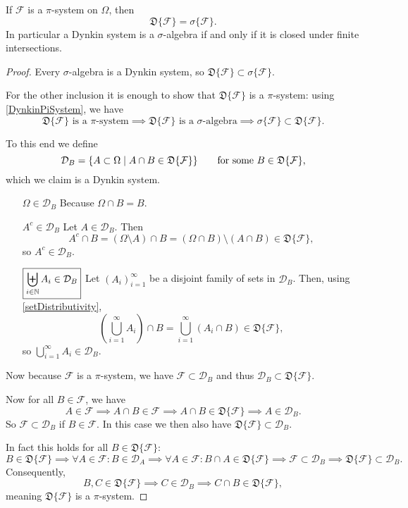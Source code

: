 \begin{proposition} \label{generatedDynkinSigma}
If $\mathcal{F}$ is a $\pi$-system on $\Omega$, then
\[ \mathfrak{D}\{\mathcal{F}\} = \sigma\{\mathcal{F}\}. \]
In particular a Dynkin system is a $\sigma$-algebra \textup{if and only if} it is closed under finite intersections.
\end{proposition}
\begin{proof}
Every $\sigma$-algebra is a Dynkin system, so $\mathfrak{D}\{\mathcal{F}\} \subset \sigma\{\mathcal{F}\}$.

For the other inclusion it is enough to show that $\mathfrak{D}\{\mathcal{F}\}$ is a $\pi$-system: using \ref{DynkinPiSystem}, we have
\[ \text{$\mathfrak{D}\{\mathcal{F}\}$ is a $\pi$-system} \implies \text{$\mathfrak{D}\{\mathcal{F}\}$ is a $\sigma$-algebra} \implies \sigma\{\mathcal{F}\}\subset\mathfrak{D}\{\mathcal{F}\}. \]

To this end we define
\[ \mathcal{D}_B = \setbuilder{A\subset\Omega}{A\cap B\in\mathfrak{D}\{\mathcal{F}\}} \qquad \text{for some $B\in\mathfrak{D}\{\mathcal{F}\}$,} \]
which we claim is a Dynkin system.
\begin{itemize}[leftmargin=2.5cm]
\item[$\boxed{\Omega\in\mathcal{D}_B}$] Because $\Omega\cap B = B$.
\item[$\boxed{A^c\in\mathcal{D}_B}$] Let $A\in\mathcal{D}_B$. Then
\[ A^c\cap B = (\Omega\setminus A)\cap B = (\Omega\cap B)\setminus(A\cap B) \in \mathfrak{D}\{\mathcal{F}\}, \]
so $A^c\in\mathcal{D}_B$.
\item[$\boxed{\biguplus_{i\in \mathbb{N}}A_i \in \mathcal{D}_B}$] Let $(A_i)_{i=1}^\infty$ be a disjoint family of sets in $\mathcal{D}_B$. Then, using \ref{setDistributivity},
\[ \left(\bigcup_{i=1}^\infty A_i\right)\cap B = \bigcup_{i=1}^\infty (A_i\cap B) \in \mathfrak{D}\{\mathcal{F}\}, \]
so $\bigcup_{i=1}^\infty A_i\in\mathcal{D}_B$.
\end{itemize}
Now because $\mathcal{F}$ is a $\pi$-system, we have $\mathcal{F}\subset\mathcal{D}_B$ and thus $\mathcal{D}_B\subset\mathfrak{D}\{\mathcal{F}\}$.

Now for all $B\in\mathcal{F}$, we have
\[ A\in\mathcal{F}\implies A\cap B\in\mathcal{F}\implies A\cap B\in\mathfrak{D}\{\mathcal{F}\} \implies A\in \mathcal{D}_B. \]
So $\mathcal{F}\subset \mathcal{D}_B$ if $B\in\mathcal{F}$. In this case we then also have $\mathfrak{D}\{\mathcal{F}\}\subset \mathcal{D}_B$.

In fact this holds for all $B\in\mathfrak{D}\{\mathcal{F}\}$:
\[ B\in\mathfrak{D}\{\mathcal{F}\} \implies \forall A\in\mathcal{F}: B\in\mathcal{D}_A \implies  \forall A\in\mathcal{F}: B\cap A \in \mathfrak{D}\{\mathcal{F}\} \implies \mathcal{F}\subset\mathcal{D}_B \implies \mathfrak{D}\{\mathcal{F}\}\subset \mathcal{D}_B. \]
Consequently,
\[ B,C\in\mathfrak{D}\{\mathcal{F}\} \implies C\in\mathcal{D}_B \implies C\cap B\in\mathfrak{D}\{\mathcal{F}\}, \]
meaning $\mathfrak{D}\{\mathcal{F}\}$ is a $\pi$-system.
\end{proof}
